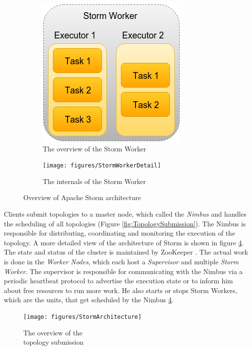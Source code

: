 \documentclass[conference]{IEEEtran}
\begin{document}
\begin{figure}[!h]
\centering
	\begin{subfigure}{.55\columnwidth}
		\includegraphics[scale=0.45]{figures/StormWorker}
		    \caption{The overview of the Storm Worker}
		    \label{fig:StormWorkerOverview}
	\end{subfigure}\hspace{2.9em}
	\begin{subfigure}{1.35\columnwidth}
		\texttt{[image: figures/StormWorkerDetail]}
		    \caption{The internals of the Storm Worker}
		    \label{fig:StormWorkerDetail}
	\end{subfigure}\hfill
\label{fig:StormArchitectureOverview}
\caption{Overview of Apache Storm architecture}
\end{figure}

Clients submit topologies to a master node, which called the \emph{Nimbus} and handles the scheduling of all topologies (Figure \ref{fig:TopologySubmission}).
The Nimbus is responsible for distributing, coordinating and monitoring the execution of the topology.
A more detailed view of the architecture of Storm is shown in figure \ref{fig:StormArchitecture}.
The state and status of the cluster is maintained by ZooKeeper \cite{Zookeeper}.
The actual work is done in the \emph{Worker Nodes}, which each host a \emph{Supervisor} and multiple \emph{Storm Worker}.
The supervisor is responsible for communicating with the Nimbus via a periodic heartbeat protocol to advertise the execution state or to inform him about free resources to run more work.
He also starts or stops Storm Workers, which are the units, that get scheduled by the Nimbus \ref{fig:StormArchitecture}.

\begin{figure}[!hb]
		\texttt{[image: figures/StormArchitecture]}
		\caption{The overview of the \\topology submission}
		\label{fig:StormArchitecture}
\end{figure}
\end{document}
